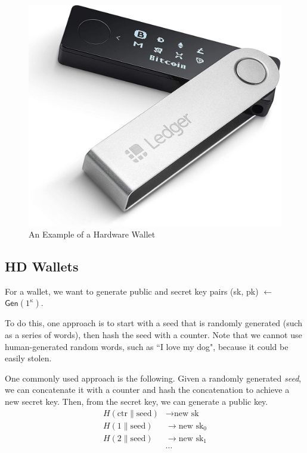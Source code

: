 \begin{figure}[ht]
    \centering
    \includegraphics[scale = 0.1]{figures/hardware_wallet.jpg}
    \caption{An Example of a Hardware Wallet\cite{hard}}
    \label{fig:hardware_wallet}
\end{figure}


\subsection{HD Wallets}
For a wallet, we want to generate public and secret key pairs (sk, pk) $\longleftarrow$ $\mathsf{Gen}(1^\kappa)$.

To do this, one approach is to start with a seed that is randomly generated (such as a series of words), then hash the seed with a counter. Note that we cannot use human-generated random words, such as ``I love my dog", because it could be easily stolen.

One commonly used approach is the following. Given a randomly generated \textit{seed}, we can concatenate it with a counter and hash the concatenation to achieve a new secret key. Then, from the secret key, we can generate a public key.
\begin{align*}
H(\text{ctr}\|\text{seed})&\longrightarrow \text{new sk} \\
H(1\|\text{seed}) &\longrightarrow \text{new sk}_0  \\
H(2\|\text{seed}) &\longrightarrow \text{new sk}_1 \\
&\cdots
\end{align*}

